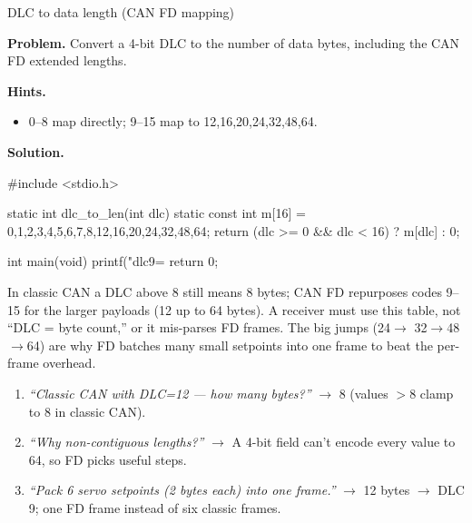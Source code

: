\begin{gymproblem}{DLC to data length (CAN FD mapping)}

\textbf{Problem.} Convert a 4-bit DLC to the number of data bytes, including the
CAN FD extended lengths.

\textbf{Hints.}
\begin{itemize}
\item 0--8 map directly; 9--15 map to 12,16,20,24,32,48,64.
\end{itemize}

\attempt

\textbf{Solution.}
\begin{cgym}
#include <stdio.h>

static int dlc_to_len(int dlc) {
    static const int m[16] = {0,1,2,3,4,5,6,7,8,12,16,20,24,32,48,64};
    return (dlc >= 0 && dlc < 16) ? m[dlc] : 0;
}

int main(void) {
    printf("dlc9=%
    return 0;
}
\end{cgym}

In classic CAN a DLC above 8 still means 8 bytes; CAN FD repurposes codes 9--15
for the larger payloads (12 up to 64 bytes). A receiver must use this table, not
``DLC = byte count,'' or it mis-parses FD frames. The big jumps (24$\rightarrow$
32$\rightarrow$48$\rightarrow$64) are why FD batches many small setpoints into
one frame to beat the per-frame overhead.

\followups
\begin{enumerate}
\item \emph{``Classic CAN with DLC=12 --- how many bytes?''} $\rightarrow$ 8
  (values $>$8 clamp to 8 in classic CAN).
\item \emph{``Why non-contiguous lengths?''} $\rightarrow$ A 4-bit field can't
  encode every value to 64, so FD picks useful steps.
\item \emph{``Pack 6 servo setpoints (2 bytes each) into one frame.''}
  $\rightarrow$ 12 bytes $\rightarrow$ DLC 9; one FD frame instead of six classic
  frames.
\end{enumerate}
\end{gymproblem}

